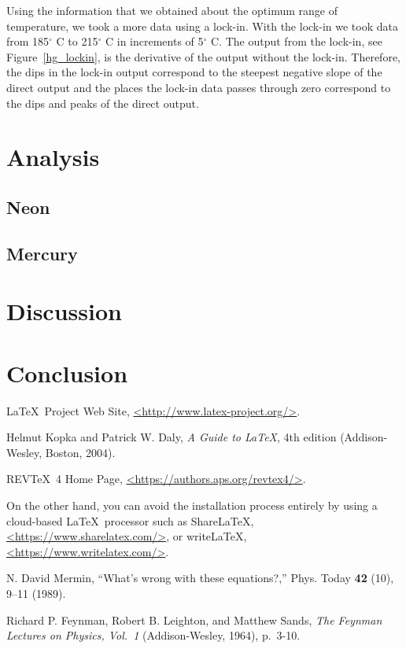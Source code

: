 \documentclass[prb,preprint]{revtex4-1}
\begin{document}
Using the information that we obtained about the optimum range of temperature, we took a more data using a lock-in. With the lock-in we took data from 185$^{\circ}$ C to 215$^{\circ}$ C in increments of 5$^{\circ}$ C. The output from the lock-in, see Figure~\ref{hg_lockin}, is the derivative of the output without the lock-in. Therefore, the dips in the lock-in output correspond to the steepest negative slope of the direct output and the places the lock-in data passes through zero correspond to the dips and peaks of the direct output.


\section{Analysis}

\subsection{Neon}
\subsection{Mercury}

\section{Discussion}


\section{Conclusion}



\begin{thebibliography}{9}


 \LaTeX\ Project Web Site, \url{<http://www.latex-project.org/>}.

Helmut Kopka and Patrick W. Daly, \textit{A Guide to
\LaTeX}, 4th edition (Addison-Wesley, Boston, 2004).

 REV\TeX\ 4 Home Page, \url{<https://authors.aps.org/revtex4/>}.

 On the other hand, you can avoid the installation process
entirely by using a cloud-based \LaTeX\ processor such as ShareLaTeX,
\url{<https://www.sharelatex.com/>}, or write\LaTeX, \url{<https://www.writelatex.com/>}.

 N. David Mermin, ``What's wrong with these equations?,'' 
Phys. Today \textbf{42} (10), 9--11 (1989).  

 Richard P. Feynman, Robert B. Leighton, and Matthew Sands, 
\textit{The Feynman Lectures on Physics, Vol.\ 1} (Addison-Wesley, 1964), p.~3-10.


\end{thebibliography}
\end{document}
